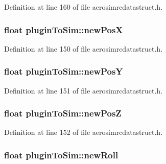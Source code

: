 \-Definition at line 160 of file aerosimrcdatastruct.\-h.

\hypertarget{group___aero_sim_r_c_ga2067141174f8fa27f36b9831b73b5668}{
\subsubsection[{new\-Pos\-X}]{\setlength{\rightskip}{0pt plus 5cm}float {\bf plugin\-To\-Sim\-::new\-Pos\-X}}}\label{group___aero_sim_r_c_ga2067141174f8fa27f36b9831b73b5668}


\-Definition at line 150 of file aerosimrcdatastruct.\-h.

\hypertarget{group___aero_sim_r_c_gab0bd49c25f923d60f12c350160c63f4f}{
\subsubsection[{new\-Pos\-Y}]{\setlength{\rightskip}{0pt plus 5cm}float {\bf plugin\-To\-Sim\-::new\-Pos\-Y}}}\label{group___aero_sim_r_c_gab0bd49c25f923d60f12c350160c63f4f}


\-Definition at line 151 of file aerosimrcdatastruct.\-h.

\hypertarget{group___aero_sim_r_c_ga85e01d3ec1ec3924a0482565262ccd80}{
\subsubsection[{new\-Pos\-Z}]{\setlength{\rightskip}{0pt plus 5cm}float {\bf plugin\-To\-Sim\-::new\-Pos\-Z}}}\label{group___aero_sim_r_c_ga85e01d3ec1ec3924a0482565262ccd80}


\-Definition at line 152 of file aerosimrcdatastruct.\-h.

\hypertarget{group___aero_sim_r_c_ga83b167dd0c9161f47923432618fac9c4}{
\subsubsection[{new\-Roll}]{\setlength{\rightskip}{0pt plus 5cm}float {\bf plugin\-To\-Sim\-::new\-Roll}}}\label{group___aero_sim_r_c_ga83b167dd0c9161f47923432618fac9c4}


